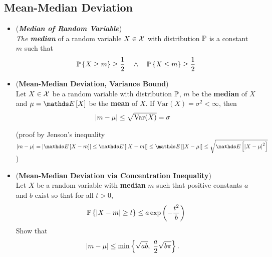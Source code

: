 \documentclass[11pt]{article}
\begin{document}
\subsection{Mean-Median Deviation}
\begin{itemize}
\item \begin{definition} (\emph{\textbf{Median of Random Variable}})\\
\emph{The \textbf{median}} of a random variable $X \in {\mathcal X}$ with distribution ${\mathbb P}$ is a constant $m$ such that
\begin{align*}
{\mathbb P}\left\{X \ge m \right\} \ge \frac{1}{2} \quad \land \quad {\mathbb P}\left\{X \le m \right\} \ge \frac{1}{2}
\end{align*}
\end{definition}

\item \begin{proposition} (\textbf{Mean-Median Deviation, Variance Bound}) \citep{boucheron2013concentration} \\
Let $X \in {\mathcal X}$ be a random variable with distribution ${\mathbb P}$, $m$ be the \textbf{median} of $X$ and $\mu = \E{}{X}$ be the \textbf{mean} of $X$. If $\text{Var}(X) = \sigma^2 < \infty$,  then 
\begin{align}
\left\lvert m - \mu \right\rvert &\le \sqrt{\text{Var}(X)} = \sigma \label{ineqn: median_mean_variance_bound}
\end{align}
\end{proposition} (proof by Jenson's inequality $\abs{m - \mu} = \abs{\E{}{X - m}} \le \E{}{\abs{X - m}} \le \E{}{\abs{X - \mu}} \le \sqrt{\E{}{\abs{X - \mu}^2}}$)

\item \begin{exercise}  (\textbf{Mean-Median Deviation via Concentration Inequality}) \citep{boucheron2013concentration} \\
Let $X$ be a random variable with \textbf{median} $m$ such that positive constants $a$ and $b$ exist so that for all $t > 0$,
\begin{align*}
{\mathbb P}\left\{\left\lvert X - m \right\rvert \ge t\right\} \le a \exp\left(- \frac{t^2}{b}\right)
\end{align*} Show that 
\begin{align*}
\left\lvert m - \mu \right\rvert &\le \min\left\{\sqrt{ab}, \;\frac{a}{2}\sqrt{b\pi}\right\}.
\end{align*}
\end{exercise}


\end{itemize}
\end{document}
